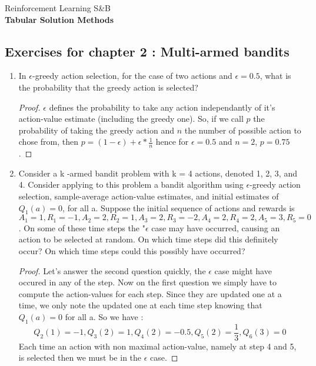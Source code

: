 \documentclass[]{book}
\theoremstyle{definition}
\begin{document}
\begin{center}
{\Large Reinforcement Learning \hspace{0.5cm} S\&B}\\
\textbf{Tabular Solution Methods}\\ %
\end{center}

\vspace{0.2 cm}


\subsection*{Exercises for chapter 2 : Multi-armed bandits}
\begin{enumerate}
    \item In $\epsilon$-greedy action selection, for the case of two actions and $\epsilon = 0.5$, what is
    the probability that the greedy action is selected?
    \begin{proof}
        $\epsilon$ defines the probability to take any action independantly of it's action-value estimate (including the greedy one). So, if we call $p$ the probability of taking the greedy action and $n$ the number of possible action to chose from, then $p = (1 - \epsilon) + \epsilon * \frac{1}{n}$ hence for $\epsilon = 0.5$ and $n = 2$, $p = 0.75$.
    \end{proof}

    \item Consider a k -armed bandit problem with k = 4 actions, denoted 1, 2, 3, and 4. Consider applying to this problem a bandit algorithm using $\epsilon$-greedy action selection, sample-average action-value estimates, and initial estimates of $Q_1 (a) = 0$, for all a. Suppose the initial sequence of actions and rewards is $A_1 = 1, R_1 = -1, A_2 = 2, R_2 = 1, A_3 = 2, R_3 = -2, A_4 = 2, R_4 = 2, A_5 = 3, R_5 = 0$. On some of these time steps the "$\epsilon$ case may have occurred, causing an action to be selected at random. On which time steps did this definitely occur? On which time steps could this possibly have occurred?
    \begin{proof}
        Let's answer the second question quickly, the $\epsilon$ case might have occured in any of the step. Now on the first question we simply have to compute the action-values for each step. Since they are updated one at a time, we only note the updated one at each time step knowing that $Q_1(a) = 0$ for all a. So we have :
        \[ Q_2(1) = -1, Q_3(2) = 1, Q_4(2) = -0.5, Q_5(2) = \frac{1}{3}, Q_6(3) = 0 \]
        Each time an action with non maximal action-value, namely at step 4 and 5, is selected then we must be in the $\epsilon$ case.
    \end{proof}


\end{enumerate}
\end{document}
